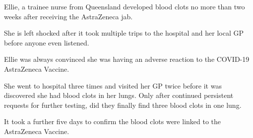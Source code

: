 Ellie, a trainee nurse from Queensland developed blood clots no more than two
weeks after receiving the AstraZeneca jab.

She is left shocked after it took multiple trips to the hospital and her local
GP before anyone even listened.

Ellie was always convinced she was having an adverse reaction to the COVID-19
AstraZeneca Vaccine.

She went to hospital three times and visited her GP twice before it was
discovered she had blood clots in her lungs. Only after continued persistent
requests for further testing, did they finally find three blood clots in one
lung.

It took a further five days to confirm the blood clots were linked to the
AstraZeneca Vaccine.

